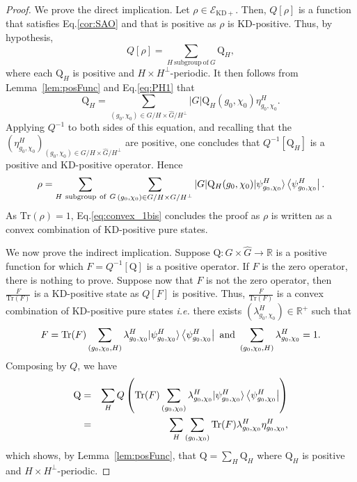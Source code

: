 \documentclass[a4paper, notitlepage, 11pt]{article}
\numberwithin{equation}{section}
\newcommand{\cket}[1]{|#1\rangle}
\newcommand{\mcl}[1]{\ensuremath{\mathcal{#1}}}
\newcommand{\EcalKDC}{{\mcl E}_{\mathrm{KD+}}}
\newcommand{\R}{\mathbb{R}}
\newcommand{\card}[1]{\left|#1\right|}
\begin{document}
\begin{proof}
    We prove the direct implication. Let $\rho\in \EcalKDC$. Then, $Q[\rho]$ is a function that satisfies Eq.\eqref{cor:SAO} and that is positive as $\rho$ is KD-positive. Thus, by hypothesis,
    \begin{equation}\label{eq:qrhoqh}
        Q[\rho] = \sum_{H\mathrm{ \ subgroup \ of \ } G} \mathrm{Q}_{H},
    \end{equation}
    where each $\mathrm{Q}_H$ is positive and $H\times H^\perp$-periodic.
    It then follows from Lemma~\ref{lem:posFunc} and Eq.\eqref{eq:PH1} that
    \begin{equation}\label{eq:PH1bis}
    \mathrm{Q}_H = \sum_{(g_0,\chi_0)\in G/H\times\hat{G}/H^{\perp}} \card{G}\mathrm{Q}_H(g_0,\chi_0)\eta^{H}_{g_0,\chi_0}.
\end{equation}
Applying $Q^{-1}$ to both sides of this equation, and recalling that the  $\left(\eta^{H}_{g_0,\chi_0}\right)_{(g_0,\chi_0)\in G/H\times\hat{G}/H^{\perp}}$ are positive, one concludes that $Q^{-1}[\mathrm{Q}_H]$ is a positive and KD-positive operator. Hence
 \begin{equation}\label{eq:convex_1bis}
        \rho = \sum_{H\mathrm{ \ subgroup \ of \ } G} \sum_{(g_{0},\chi_{0})\in G/H\times G/H^{\perp}} |G|\mathrm{Q}_H(g_0, \chi_0)\cket{\psi^{H}_{g_0,\chi_0}}\bra{\psi^{H}_{g_0,\chi_0}}.
 \end{equation}
As $\mathrm{Tr}(\rho)=1$, Eq.\eqref{eq:convex_1bis} concludes the proof as $\rho$ is written as a convex combination of KD-positive pure states.
    
    We now prove the indirect implication. Suppose $\mathrm{Q}: G\times \hat{G}\to \R$ is a positive function for which $F = Q^{-1}[\mathrm{Q}]$ is a positive operator. If $F$ is the zero operator, there is nothing to prove. Suppose now that $F$ is not the zero operator, then $\frac{F}{\mathrm{Tr}(F)}$ is a KD-positive state as $Q[F]$ is positive. Thus, $\frac{F}{\mathrm{Tr}(F)}$ is a convex combination of KD-positive pure states \textit{i.e.} there exists $\left(\lambda_{g_{0},\chi_{0}}^{H}\right)\in\R^{+}$ such that
    \begin{equation}
    F = \mathrm{Tr}(F) \sum_{(g_{0},\chi_{0},H)} \lambda_{g_{0},\chi_{0}}^{H} \cket{\psi^{H}_{g_0,\chi_0}}\bra{\psi^{H}_{g_0,\chi_0}} \mathrm{ \ and \ }  \sum_{(g_{0},\chi_{0},H)} \lambda_{g_{0},\chi_{0}}^{H} = 1.
    \end{equation}
    Composing by $Q$, we have
    \begin{eqnarray}
        \nonumber \mathrm{Q} &=& \sum_{H} Q\left(\mathrm{Tr}(F) \sum_{(g_{0},\chi_{0})} \lambda_{g_{0},\chi_{0}}^{H} \cket{\psi^{H}_{g_0,\chi_0}}\bra{\psi^{H}_{g_0,\chi_0}}\right)\\
        &=&\sum_{H} \sum_{(g_{0},\chi_{0})} \mathrm{Tr}(F)\lambda_{g_{0},\chi_{0}}^{H} \eta^{H}_{g_0,\chi_0},
    \end{eqnarray}
    which shows, by Lemma~\ref{lem:posFunc}, that $\mathrm{Q} =\sum_{H} \mathrm{Q}_{H} $ where $\mathrm{Q}_{H}$ is positive and $H\times H^{\perp}$-periodic.
\end{proof}
\end{document}
